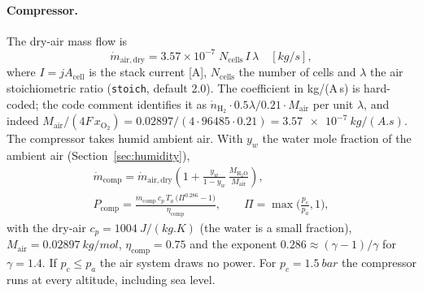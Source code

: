 \documentclass[a4paper,11pt]{article}
\newcommand{\code}[1]{\nolinkurl{#1}}
\begin{document}
\paragraph{Compressor.} The dry-air mass flow is
\begin{equation}
  \dot m_\mathrm{air,dry} = 3.57\times10^{-7}\; N_\mathrm{cells}\, I\, \lambda
  \quad [\si{kg/s}],
  \label{eq:mair}
\end{equation}
where $I=jA_\mathrm{cell}$ is the stack current [A], $N_\mathrm{cells}$ the number of cells
and $\lambda$ the air stoichiometric ratio (\code{stoich}, default 2.0). The coefficient in
kg/(A\,s) is hard-coded; the code comment identifies it as $\dot n_{\mathrm{H_2}}\cdot
0.5\lambda/0.21\cdot M_\mathrm{air}$ per unit $\lambda$, and indeed
$M_\mathrm{air}/(4F\,x_{\mathrm{O_2}}) = 0.02897/(4\cdot96485\cdot0.21) = \SI{3.57e-7}{kg/(A.s)}$.
The compressor takes humid ambient air. With $y_w$ the water mole fraction of the ambient air
(Section~\ref{sec:humidity}),
\begin{gather}
  \dot m_\mathrm{comp} = \dot m_\mathrm{air,dry}\left(1+\frac{y_w}{1-y_w}\,
  \frac{M_{\mathrm{H_2O}}}{M_\mathrm{air}}\right), \\
  P_\mathrm{comp} = \frac{\dot m_\mathrm{comp}\, c_p\, T_a\, \big(\Pi^{0.286}-1\big)}{\eta_\mathrm{comp}},
  \qquad \Pi = \max\!\Big(\frac{p_c}{p_a},1\Big),
\end{gather}
with the dry-air $c_p=\SI{1004}{J/(kg.K)}$ (the water is a small fraction), $M_\mathrm{air}=
\SI{0.02897}{kg/mol}$, $\eta_\mathrm{comp}=0.75$ and the exponent $0.286\approx(\gamma-1)/\gamma$
for $\gamma=1.4$. If $p_c\le p_a$ the air system draws no power. For $p_c=\SI{1.5}{bar}$ the
compressor runs at every altitude, including sea level.
\end{document}
